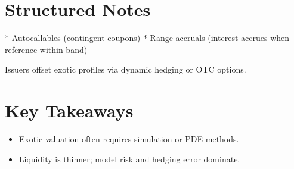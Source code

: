 \section{Structured Notes}

* Autocallables (contingent coupons)  
* Range accruals (interest accrues when reference within band)  

Issuers offset exotic profiles via dynamic hedging or OTC options.

\section*{Key Takeaways}
\begin{itemize}
  \item Exotic valuation often requires simulation or PDE methods.
  \item Liquidity is thinner; model risk and hedging error dominate.
\end{itemize}
